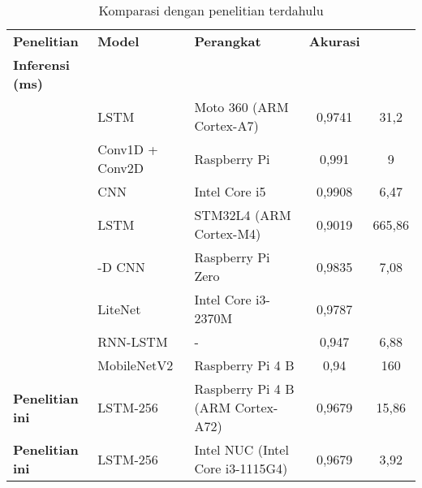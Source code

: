 \begin{table}[H]
\centering
\caption{Komparasi dengan penelitian terdahulu}
\label{tab:komparasi}
\begin{tabularx}{\textwidth}{
  |>{\raggedright\arraybackslash}X
  |>{\centring\arraybackslash}X
  |>{\raggedright\arraybackslash}X
  |c
  |c
|}
\hline
\textbf{Penelitian} & \textbf{Model} & \textbf{Perangkat} & \textbf{Akurasi} & \makecell{\textbf{Waktu} \\ \textbf{Inferensi (ms)}} \\ \hline

\cite{saadatnejadLSTMBasedECGClassification2020} & LSTM & Moto 360 (ARM Cortex-A7) & 0,9741 & 31,2\\
\hline

\cite{9878113} & Conv1D + Conv2D & Raspberry Pi & 0,991 & 9\\
\hline

\cite{sururiComparisonSeveralWavelet2023} & CNN & Intel Core i5 & 0,9908 & 6,47\\
\hline

\cite{FALASCHETTI20223479} & LSTM & STM32L4 (ARM Cortex-M4) & 0,9019 & 665,86\\
\hline

\cite{liEnablingOndeviceClassification2021} & 1-D CNN & Raspberry Pi Zero & 0,9835 & 7,08\\
\hline

\cite{heLiteNetLightweightNeural2018} & LiteNet & Intel Core i3-2370M & 0,9787 & \tilde 25\\
\hline

\cite{abayaratneRealTimeCardiacArrhythmia2019} & RNN-LSTM & - & 0,947 & 6,88\\
\hline

\cite{mhamdiArtificialIntelligenceCardiac2022} & MobileNetV2 & Raspberry Pi 4 B & 0,94 & 160\\
\hline

\textbf{Penelitian ini} & LSTM-256 & Raspberry Pi 4 B (ARM Cortex-A72) & 0,9679 & 15,86\\
\hline
\textbf{Penelitian ini} & LSTM-256 & Intel NUC (Intel Core i3-1115G4) & 0,9679 & 3,92\\ 

\hline
\end{tabularx}
\end{table}

